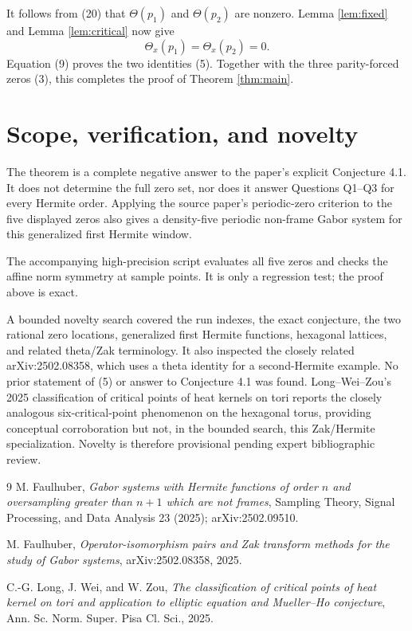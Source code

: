 \documentclass[11pt]{article}
\begin{document}
It follows from (20) that \(\Theta(p_1)\) and \(\Theta(p_2)\) are nonzero.
Lemma \ref{lem:fixed} and Lemma \ref{lem:critical} now give
\[
 \Theta_x(p_1)=\Theta_x(p_2)=0.
\]
Equation (9) proves the two identities (5).  Together with the three
parity-forced zeros (3), this completes the proof of Theorem
\ref{thm:main}.

\section{Scope, verification, and novelty}

The theorem is a complete negative answer to the paper's explicit Conjecture
4.1.  It does not determine the full zero set, nor does it answer Questions
Q1--Q3 for every Hermite order.  Applying the source paper's periodic-zero
criterion to the five displayed zeros also gives a density-five periodic
non-frame Gabor system for this generalized first Hermite window.

The accompanying high-precision script evaluates all five zeros and checks
the affine norm symmetry at sample points.  It is only a regression test; the
proof above is exact.

A bounded novelty search covered the run indexes, the exact conjecture,
the two rational zero locations, generalized first Hermite functions,
hexagonal lattices, and related theta/Zak terminology.  It also inspected
the closely related arXiv:2502.08358, which uses a theta identity for a
second-Hermite example.  No prior statement of (5) or answer to Conjecture
4.1 was found.  Long--Wei--Zou's 2025 classification of critical points of
heat kernels on tori reports the closely analogous six-critical-point
phenomenon on the hexagonal torus, providing conceptual corroboration but
not, in the bounded search, this Zak/Hermite specialization.  Novelty is
therefore provisional pending expert bibliographic review.

\begin{thebibliography}{9}
M. Faulhuber,
\emph{Gabor systems with Hermite functions of order \(n\) and oversampling
greater than \(n+1\) which are not frames},
Sampling Theory, Signal Processing, and Data Analysis 23 (2025);
arXiv:2502.09510.

M. Faulhuber,
\emph{Operator-isomorphism pairs and Zak transform methods for the study of
Gabor systems},
arXiv:2502.08358, 2025.

C.-G. Long, J. Wei, and W. Zou,
\emph{The classification of critical points of heat kernel on tori and
application to elliptic equation and Mueller--Ho conjecture},
Ann. Sc. Norm. Super. Pisa Cl. Sci., 2025.
\end{thebibliography}
\end{document}
